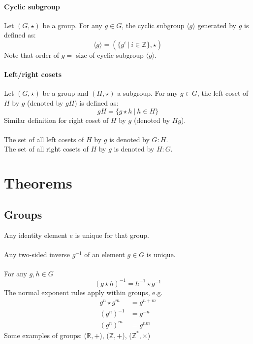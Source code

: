 \documentclass{scrartcl}
\newcommand{\R}{\mathbb{R}}
\newcommand{\Z}{\mathbb{Z}}
\begin{document}
\paragraph{Cyclic subgroup}
Let $ (G, \star) $ be a group. For any $ g \in G $, the cyclic subgroup $ \langle g \rangle $ generated by $ g $ is defined as:
\begin{equation}
\langle g \rangle = (\{g^{i} \ | \ i \in \Z \}, \star)
\end{equation}
Note that order of $ g  = $  size of cyclic subgroup $ \langle g \rangle $.
\paragraph{Left/right cosets}
Let $ (G, \star) $ be a group and $ (H, \star) $ a subgroup. For any $ g \in G $, the left coset of $ H $ by $ g $ (denoted by $ gH $) is defined as:
\begin{equation}
gH = \{g \star h \ | \ h \in H \}
\end{equation}
Similar definition for right coset of $ H $ by $ g $ (denoted by $ Hg $).
\\\\
The set of all left cosets of $ H $ by $ g $ is denoted by $ G : H $.
\\
The set of all right cosets of $ H $ by $ g $ is denoted by $ H : G $.

\section{Theorems}

\subsection{Groups}
Any identity element $ e $ is unique for that group.
\\\\
Any two-sided inverse $ g^{-1} $ of an element $ g \in G $ is unique.
\\\\
For any $g, h \in G $
\begin{equation}
(g \star h)^{-1} = h^{-1} \star g^{-1}
\end{equation}
The normal exponent rules apply within groups, e.g.
\begin{align}
g^{n} \star g^{m} & = g^{n+m} \\
(g^{n})^{-1} & = g^{-n} \\
(g^{n})^{m} & = g^{nm}
\end{align}
Some examples of groups:
($ \R, + $), ($ \Z, + $), ($ \Z^{*}, \times $)
\end{document}
